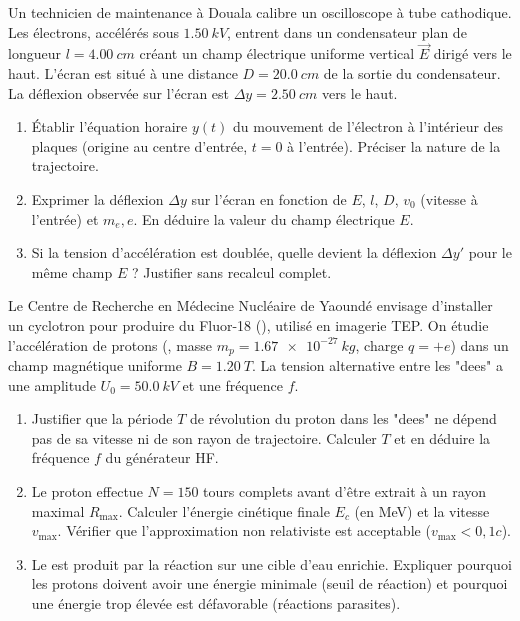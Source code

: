 \documentclass[11pt]{article}
\begin{document}
\begin{exercice}
Un technicien de maintenance à Douala calibre un oscilloscope à tube cathodique. Les électrons, accélérés sous $\SI{1,50}{kV}$, entrent dans un condensateur plan de longueur $l = \SI{4,00}{cm}$ créant un champ électrique uniforme vertical $\vec{E}$ dirigé vers le haut. L'écran est situé à une distance $D = \SI{20,0}{cm}$ de la sortie du condensateur. La déflexion observée sur l'écran est $\Delta y = \SI{2,50}{cm}$ vers le haut.
\begin{enumerate}
    \item Établir l'équation horaire $y(t)$ du mouvement de l'électron à l'intérieur des plaques (origine au centre d'entrée, $t=0$ à l'entrée). Préciser la nature de la trajectoire.
    \item Exprimer la déflexion $\Delta y$ sur l'écran en fonction de $E$, $l$, $D$, $v_0$ (vitesse à l'entrée) et $m_e, e$. En déduire la valeur du champ électrique $E$.
    \item Si la tension d'accélération est doublée, quelle devient la déflexion $\Delta y'$ pour le même champ $E$ ? Justifier sans recalcul complet.
\end{enumerate}
\end{exercice}

\begin{exercice}
Le Centre de Recherche en Médecine Nucléaire de Yaoundé envisage d'installer un cyclotron pour produire du Fluor-18 (), utilisé en imagerie TEP. On étudie l'accélération de protons (, masse $m_p = \SI{1,67e-27}{kg}$, charge $q = +e$) dans un champ magnétique uniforme $B = \SI{1,20}{T}$. La tension alternative entre les "dees" a une amplitude $U_0 = \SI{50,0}{kV}$ et une fréquence $f$.
\begin{enumerate}
    \item Justifier que la période $T$ de révolution du proton dans les "dees" ne dépend pas de sa vitesse ni de son rayon de trajectoire. Calculer $T$ et en déduire la fréquence $f$ du générateur HF.
    \item Le proton effectue $N = 150$ tours complets avant d'être extrait à un rayon maximal $R_{\text{max}}$. Calculer l'énergie cinétique finale $E_c$ (en MeV) et la vitesse $v_{\text{max}}$. Vérifier que l'approximation non relativiste est acceptable ($v_{\text{max}} < 0,1c$).
    \item Le  est produit par la réaction  sur une cible d'eau enrichie. Expliquer pourquoi les protons doivent avoir une énergie minimale (seuil de réaction) et pourquoi une énergie trop élevée est défavorable (réactions parasites).
\end{enumerate}
\end{exercice}
\end{document}
